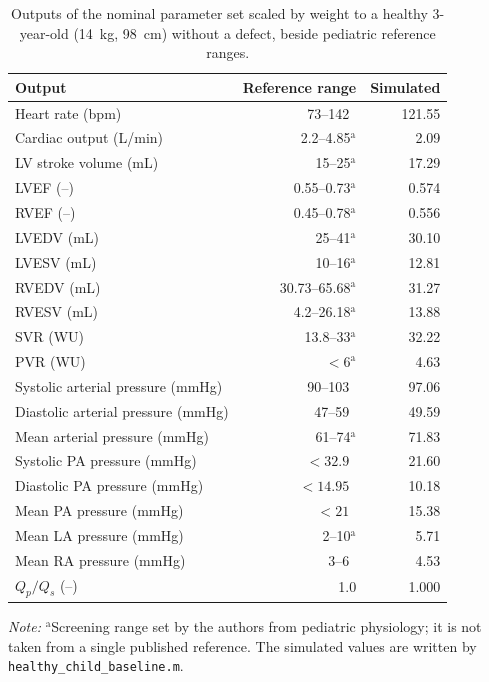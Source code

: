\documentclass{article}
\begin{document}
\begin{table}[H]
\centering\small
\caption{Outputs of the nominal parameter set scaled by weight to a healthy 3-year-old (14~kg, 98~cm) without a defect, beside pediatric reference ranges.}
\label{tab:S-healthy}
\begin{tabular}{lrr}
\toprule
\textbf{Output} & \textbf{Reference range} & \textbf{Simulated} \\
\midrule
Heart rate (bpm) & 73--142~\cite{Joyce2025} & 121.55 \\
Cardiac output (L/min) & 2.2--4.85$^{\mathrm{a}}$ & 2.09 \\
LV stroke volume (mL) & 15--25$^{\mathrm{a}}$ & 17.29 \\
LVEF (--) & 0.55--0.73$^{\mathrm{a}}$ & 0.574 \\
RVEF (--) & 0.45--0.78$^{\mathrm{a}}$ & 0.556 \\
LVEDV (mL) & 25--41$^{\mathrm{a}}$ & 30.10 \\
LVESV (mL) & 10--16$^{\mathrm{a}}$ & 12.81 \\
RVEDV (mL) & 30.73--65.68$^{\mathrm{a}}$ & 31.27 \\
RVESV (mL) & 4.2--26.18$^{\mathrm{a}}$ & 13.88 \\
SVR (WU) & 13.8--33$^{\mathrm{a}}$ & 32.22 \\
PVR (WU) & $<6^{\mathrm{a}}$ & 4.63 \\
Systolic arterial pressure (mmHg) & 90--103~\cite{Flynn2017} & 97.06 \\
Diastolic arterial pressure (mmHg) & 47--59~\cite{Flynn2017} & 49.59 \\
Mean arterial pressure (mmHg) & 61--74$^{\mathrm{a}}$ & 71.83 \\
Systolic PA pressure (mmHg) & $<32.9$~\cite{MalakanRad2024} & 21.60 \\
Diastolic PA pressure (mmHg) & $<14.95$~\cite{MalakanRad2024} & 10.18 \\
Mean PA pressure (mmHg) & $<21$~\cite{MalakanRad2024} & 15.38 \\
Mean LA pressure (mmHg) & 2--10$^{\mathrm{a}}$ & 5.71 \\
Mean RA pressure (mmHg) & 3--6~\cite{MalakanRad2024} & 4.53 \\
$Q_p/Q_s$ (--) & 1.0 & 1.000 \\
\bottomrule
\end{tabular}
\par\vspace{2pt}
{\footnotesize \emph{Note:} $^{\mathrm{a}}$Screening range set by the authors from pediatric physiology; it is not taken from a single published reference. The simulated values are written by \texttt{healthy\_child\_baseline.m}.}
\end{table}
\end{document}
